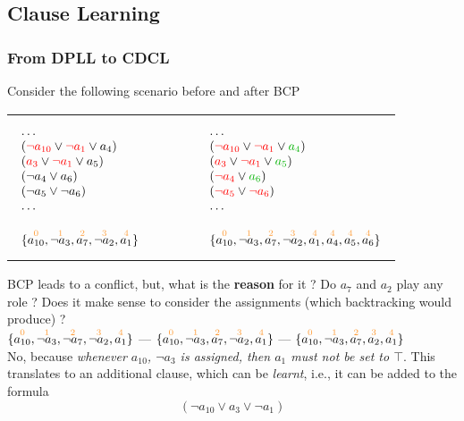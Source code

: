 \subsection{Clause Learning}

\begin{frame}
  \frametitle{From DPLL to CDCL}

  \scriptsize

  Consider the following scenario before and after BCP
  \vfill
  \begin{tabular}{ccc}
  \begin{minipage}{.4\textwidth}
  $$
  \begin{array}{l}
    \ldots \\
    (\colone{\neg a_{10}} \vee \colone{\neg a_1} \vee a_4) \\
    (\colone{a_3} \vee \colone{\neg a_1} \vee a_5) \\
    (\neg a_4 \vee a_6) \\
    (\neg a_5 \vee \neg a_6) \\
    \ldots \\
    \\
    \{ \dec{a_{10}}{0}, \dec{\neg a_3}{1}, \dec{a_7}{2}, \dec{\neg a_2}{3}, \dec{a_1}{4} \}
  \end{array}
  $$
  \end{minipage}
  & ~~~~ &
  \begin{minipage}{.5\textwidth}
  $$
  \begin{array}{l}
    \ldots \\
    (\colone{\neg a_{10}} \vee \colone{\neg a_1} \vee \coltwo{a_4}) \\
    (\colone{a_3} \vee \colone{\neg a_1} \vee \coltwo{a_5}) \\
    (\colone{\neg a_4} \vee \coltwo{a_6}) \\
    (\colone{\neg a_5} \vee \colone{\neg a_6}) \\
    \ldots \\
    \\
    \{ \dec{a_{10}}{0}, \dec{\neg a_3}{1}, \dec{a_7}{2}, \dec{\neg a_2}{3}, \dec{a_1}{4}, \dec{a_4}{4}, \dec{a_5}{4}, \dec{a_6}{4}\}
  \end{array}
  $$
  \end{minipage}
  \end{tabular}
  \vfill
  \pause
  BCP leads to a conflict, but, what is the {\bf reason} for it ?
  Do $a_7$ and $a_2$ play any role ?
  \vfill
  \pause
  Does it make sense to consider the assignments (which backtracking would produce) ?\\
  $\{ \dec{a_{10}}{0}, \dec{\neg a_3}{1}, \dec{\neg a_7}{2}, \dec{\neg a_2}{3}, \dec{a_1}{4} \}$ ---
  $\{ \dec{a_{10}}{0}, \dec{\neg a_3}{1}, \dec{a_7}{2}, \dec{\neg a_2}{3}, \dec{a_1}{4} \}$ ---
  $\{ \dec{a_{10}}{0}, \dec{\neg a_3}{1}, \dec{a_7}{2}, \dec{a_2}{3}, \dec{a_1}{4} \}$ \\
  \vfill
  \pause
  No, because {\em whenever $a_{10}$, $\neg a_3$ is assigned, then $a_1$ must not be set to $\top$}. \pause
  This translates to an additional clause, which can be {\em learnt}, i.e., it can be added to the formula 
  $$(\neg a_{10} \vee a_3 \vee \neg a_1)$$
   
\end{frame}

